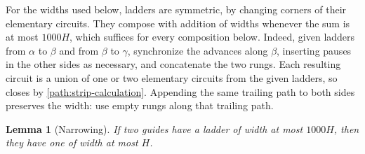 \documentclass[11pt,reqno]{amsart}
\numberwithin{equation}{section}
\newtheorem{lemma}[theorem]{Lemma}
\theoremstyle{definition}
\theoremstyle{remark}
\begin{document}
For the widths used below, ladders are symmetric, by changing corners of
their elementary circuits.  They compose with addition of widths whenever
the sum is at most $1000H$, which suffices for every composition below.
Indeed, given ladders from
$\alpha$ to $\beta$ and from $\beta$ to $\gamma$, synchronize the advances
along $\beta$, inserting pauses in the other sides as necessary, and
concatenate the two rungs.  Each resulting circuit is a union of one or
two elementary circuits from the given ladders, so closes by
\eqref{path:strip-calculation}.  Appending the same trailing path to both
sides preserves the width: use empty rungs along that trailing path.

\begin{lemma}[Narrowing]\label{path:narrowing}
If two guides have a ladder of width at most $1000H$, then they have one
of width at most $H$.
\end{lemma}
\end{document}
